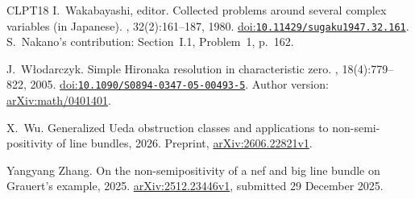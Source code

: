 \documentclass[11pt]{amsart}
\theoremstyle{definition}
\theoremstyle{remark}
\numberwithin{equation}{section}
\begin{document}
\begin{thebibliography}{CLPT18}
I.~Wakabayashi, editor.
\newblock Collected problems around several complex variables (in Japanese).
, 32(2):161--187, 1980.
\newblock \href{https://doi.org/10.11429/sugaku1947.32.161}{doi:\nolinkurl{10.11429/sugaku1947.32.161}}.
\newblock S.~Nakano's contribution: Section~I.1, Problem~1, p.~162.

J.~W{\l}odarczyk.
\newblock Simple {Hironaka} resolution in characteristic zero.
, 18(4):779--822, 2005.
\newblock \href{https://doi.org/10.1090/S0894-0347-05-00493-5}{doi:\nolinkurl{10.1090/S0894-0347-05-00493-5}}. Author version: \href{https://arxiv.org/abs/math/0401401}{arXiv:math/0401401}.

X.~Wu.
\newblock Generalized {Ueda} obstruction classes and applications to non-semi-positivity of line bundles, 2026.
\newblock Preprint, \href{https://arxiv.org/abs/2606.22821v1}{arXiv:2606.22821v1}.

Yangyang Zhang.
\newblock On the non-semipositivity of a nef and big line bundle on {Grauert's} example, 2025.
\newblock \href{https://arxiv.org/abs/2512.23446v1}{arXiv:2512.23446v1}, submitted 29 December 2025.

\end{thebibliography}
\end{document}
